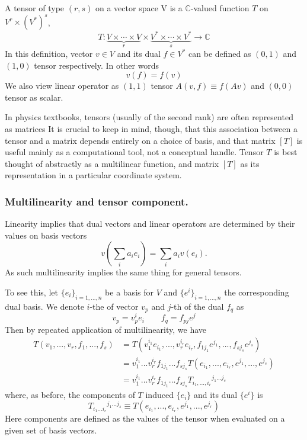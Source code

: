 \documentclass[../../../main.tex]{subfiles}
\begin{document}
A tensor of type $(r, s)$ on a vector space V is a $\mathbb{C}$-valued function $T$ on $V^r \times  (V^{*}) ^s$,
\begin{equation*}
  T : \underbrace{V \times \cdots \times V}_{r}
  \times
  \underbrace{V^* \times \cdots \times V^*}_{s}
  \to \mathbb{C}
\end{equation*}
In this definition, vector $v \in V$ and its dual $f \in V^*$ can be defined as $(0,1)$ and $(1,0)$ tensor respectively.
In other words
\begin{equation*}
  v(f)=f(v)
\end{equation*}
We also view linear operator as $(1,1)$ tensor $A(v,f)\equiv f(Av)$ and $(0,0)$ tensor as scalar.

In physics textbooks, tensors (usually of the second rank) are often represented as matrices
It is crucial to keep in mind, though, that this association between a tensor and a matrix depends entirely on a choice of basis, and that matrix $[T]$ is useful mainly as a computational tool, not a conceptual handle.
Tensor $T$ is best thought of abstractly as a multilinear function, and matrix $[T ]$ as its representation in a particular coordinate system.

\subsubsection{Multilinearity and tensor component.}
Linearity implies that dual vectors and linear operators are determined by their values on basis vectors
\begin{equation*}
  v \left(\sum_{i} a_{i} e_{i}\right) = \sum_{i} a_{i} v(e_{i}).
\end{equation*}
As such multilinearity implies the same thing for general tensors.

To see this, let  $\{e_i \}_{i=1,...,n}$ be a basis for $V$ and $\{e^i \}_{i=1,...,n}$ the corresponding dual basis.
We denote $i$-the of vector $v_p$ and $j$-th of the dual $f_q$ as
\begin{equation*}
  v_p  = v_p^i e_i\qquad
  f_q  = f_{pj} e^j
\end{equation*}
Then by repeated application of multilinearity, we have
\begin{align*}
  T(v_{1}, ..., v_{r}, f_{1}, ..., f_{s}) & =  T(v_1^{i_1} e_{i_1}, ..., v_r^{i_r} e_{i_r}, f_{1j_1} e^{j_1}, ..., f_{sj_s} e^{j_s})                        \\
                                          & =  v_{1}^{i_{1}}...v_{r}^{i_{r}} f_{1j_{1}}...f_{sj_{s}} T(e_{i_{1}}, ..., e_{i_{r}}, e^{j_{1}},..., e^{j_{s}}) \\
                                          & =  v_{1}^{i_{1}}...v_{r}^{i_{r}} f_{1j_{1}}...f_{sj_{s}} T_{i_{1},...,i_{r}}{}^{j_{1}...j_{s}}
\end{align*}
where, as before, the components of $T$ induced $\{e_i \}$ and its dual $\{e^i \}$ is
\begin{equation*}
  T_{i_{1}...i_{r}}{}^{j_{1}...j_{s}} \equiv T(e_{i_{1}},...,e_{i_{r}},e^{j_{1}},...,e^{j_{r}})
\end{equation*}
Here components are defined as the values of the tensor when evaluated on a given set of basis vectors.
\end{document}
